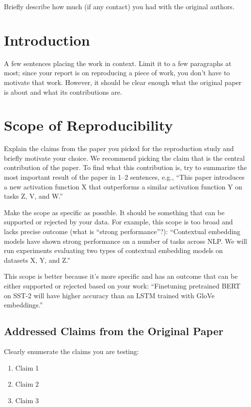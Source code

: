 \documentclass{article}
\begin{document}
Briefly describe how much (if any contact) you had with the original authors.
\newpage


\section{Introduction}
A  few  sentences  placing  the  work  in  context. Limit it to a few paragraphs at most; since your report is on reproducing a piece of work, you don’t have to motivate that work. However, it should be clear enough what the original paper is about and what its contributions are.

\section{Scope of Reproducibility}

Explain the claims from the paper you picked for the reproduction study and briefly motivate your choice. We recommend picking the claim that is the central contribution of the paper. To find what this contribution is, try to summarize the most important result of the paper in 1--2 sentences, e.g., ``This paper introduces a new activation function X that outperforms a similar activation function Y on tasks Z, V, and W.'' 

Make the scope as specific as possible. It should be something that can be supported or rejected by your data. For example, this scope is too broad and lacks precise outcome (what is ``strong performance''?): ``Contextual embedding models have shown strong performance on a number of tasks across NLP. We will run experiments evaluating two types of contextual embedding models on datasets X, Y, and Z.''

This scope is better because it's more specific and has an outcome that can be either supported or rejected based on your work: ``Finetuning pretrained BERT on SST-2 will have higher accuracy than an LSTM trained with GloVe embeddings.''

\subsection{Addressed Claims from the Original Paper} \label{claims}

Clearly enumerate the claims you are testing:
\begin{enumerate}
    \item Claim 1
    \item Claim 2
    \item Claim 3
\end{enumerate}
\end{document}
